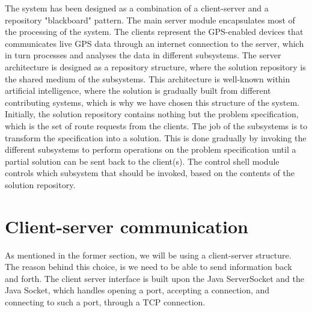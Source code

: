 The system has been designed as a combination of a client-server and a repository "blackboard" pattern. The main server module encapsulates most of the processing of the system. The clients represent the GPS-enabled devices that communicates live GPS data through an internet connection to the server, which in turn processes and analyses the data in different subsystems. The server architecture is designed as a repository structure, where the solution repository is the shared medium of the subsystems. This architecture is well-known within artificial intelligence, where the solution is gradually built from different contributing systems, which is why we have chosen this structure of the system. Initially, the solution repository contains nothing but the problem specification, which is the set of route requests from the clients. The job of the subsystems is to transform the specification into a solution. This is done gradually by invoking the different subsystems to perform operations on the problem specification until a partial solution can be sent back to the client(s). The control shell module controls which subsystem that should be invoked, based on the contents of the solution repository. 

\section{Client-server communication}
As mentioned in the former section, we will be using a client-server structure. The reason behind this choice, is we need to be able to send information back and forth.
The client server interface is built upon the Java ServerSocket and the Java Socket, which handles opening a port, accepting a connection, and connecting to such a port, through a TCP connection.

